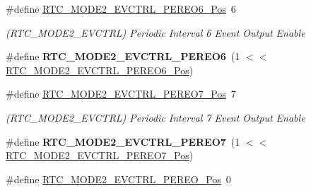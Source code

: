 \begin{DoxyCompactItemize}
\item 
\hypertarget{group___s_a_m_l21___r_t_c_ga0c7a0eff7149eaa5e4d0141ad0974cab}{}\#define \hyperlink{group___s_a_m_l21___r_t_c_ga0c7a0eff7149eaa5e4d0141ad0974cab}{R\+T\+C\+\_\+\+M\+O\+D\+E2\+\_\+\+E\+V\+C\+T\+R\+L\+\_\+\+P\+E\+R\+E\+O6\+\_\+\+Pos}~6\label{group___s_a_m_l21___r_t_c_ga0c7a0eff7149eaa5e4d0141ad0974cab}

\begin{DoxyCompactList}\small\item\em (R\+T\+C\+\_\+\+M\+O\+D\+E2\+\_\+\+E\+V\+C\+T\+R\+L) Periodic Interval 6 Event Output Enable \end{DoxyCompactList}\item 
\hypertarget{group___s_a_m_l21___r_t_c_gaa31f588c6a22301928b408c0d1142336}{}\#define {\bfseries R\+T\+C\+\_\+\+M\+O\+D\+E2\+\_\+\+E\+V\+C\+T\+R\+L\+\_\+\+P\+E\+R\+E\+O6}~(1 $<$$<$ \hyperlink{group___s_a_m_l21___r_t_c_ga0c7a0eff7149eaa5e4d0141ad0974cab}{R\+T\+C\+\_\+\+M\+O\+D\+E2\+\_\+\+E\+V\+C\+T\+R\+L\+\_\+\+P\+E\+R\+E\+O6\+\_\+\+Pos})\label{group___s_a_m_l21___r_t_c_gaa31f588c6a22301928b408c0d1142336}

\item 
\hypertarget{group___s_a_m_l21___r_t_c_ga45a14b5d2d728ce168b10ee6409526ef}{}\#define \hyperlink{group___s_a_m_l21___r_t_c_ga45a14b5d2d728ce168b10ee6409526ef}{R\+T\+C\+\_\+\+M\+O\+D\+E2\+\_\+\+E\+V\+C\+T\+R\+L\+\_\+\+P\+E\+R\+E\+O7\+\_\+\+Pos}~7\label{group___s_a_m_l21___r_t_c_ga45a14b5d2d728ce168b10ee6409526ef}

\begin{DoxyCompactList}\small\item\em (R\+T\+C\+\_\+\+M\+O\+D\+E2\+\_\+\+E\+V\+C\+T\+R\+L) Periodic Interval 7 Event Output Enable \end{DoxyCompactList}\item 
\hypertarget{group___s_a_m_l21___r_t_c_gac825eb3fba6f0f50b2ef5af507cd588d}{}\#define {\bfseries R\+T\+C\+\_\+\+M\+O\+D\+E2\+\_\+\+E\+V\+C\+T\+R\+L\+\_\+\+P\+E\+R\+E\+O7}~(1 $<$$<$ \hyperlink{group___s_a_m_l21___r_t_c_ga45a14b5d2d728ce168b10ee6409526ef}{R\+T\+C\+\_\+\+M\+O\+D\+E2\+\_\+\+E\+V\+C\+T\+R\+L\+\_\+\+P\+E\+R\+E\+O7\+\_\+\+Pos})\label{group___s_a_m_l21___r_t_c_gac825eb3fba6f0f50b2ef5af507cd588d}

\item 
\hypertarget{group___s_a_m_l21___r_t_c_gaa39844189777bb350eb746728363f19f}{}\#define \hyperlink{group___s_a_m_l21___r_t_c_gaa39844189777bb350eb746728363f19f}{R\+T\+C\+\_\+\+M\+O\+D\+E2\+\_\+\+E\+V\+C\+T\+R\+L\+\_\+\+P\+E\+R\+E\+O\+\_\+\+Pos}~0\label{group___s_a_m_l21___r_t_c_gaa39844189777bb350eb746728363f19f}


\end{DoxyCompactItemize}
